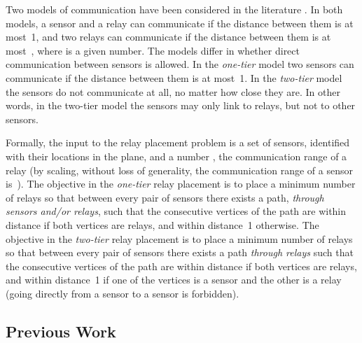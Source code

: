 \documentclass[11pt,a4paper]{article}
\theoremstyle{definition}
\theoremstyle{remark}
\begin{document}
Two models of communication have been considered in the literature \cite{bredin10deploying,chen00approximations,chen01approximations,cheng08relay,liu06optimal,lloyd07relay,srinivas06mobile,zhang07fault-tolerant}.  In both models, a sensor and a relay can communicate if the distance between them is at most~1, and two relays can communicate if the distance between them is at most~, where  is a given number.  The models differ in whether direct communication between sensors is allowed.  In the \emph{one-tier} model two sensors can communicate if the distance between them is at most~1.  In the \emph{two-tier} model the sensors do not communicate at all, no matter how close they are.  In other words, in the two-tier model the sensors may only link to relays, but not to other sensors.

Formally, the input to the relay placement problem is a set of  sensors, identified with their locations in the plane, and a number , the communication range of a relay (by scaling, without loss of generality, the communication range of a sensor is~).  The objective in the \emph{one-tier} relay placement is to place a minimum number of relays so that between every pair of sensors there exists a path, \emph{through sensors and/or relays}, such that the consecutive vertices of the path are within distance  if both vertices are relays, and within distance~1 otherwise.  The objective in the \emph{two-tier} relay placement is to place a minimum number of relays so that between every pair of sensors there exists a path \emph{through relays} such that the consecutive vertices of the path are within distance  if both vertices are relays, and within distance~1 if one of the vertices is a sensor and the other is a relay (going directly from a sensor to a sensor is forbidden).

\subsection{Previous Work}
\end{document}
